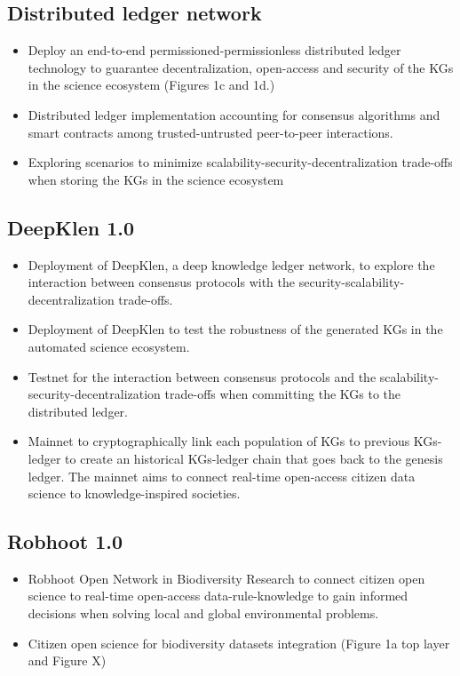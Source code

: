 \documentclass[10pt, a4paper, twocolumn]{article} %
\begin{document}
  \subsection{Distributed ledger network}
  \begin{itemize}
  \item Deploy an end-to-end permissioned-permissionless distributed
    ledger technology to guarantee decentralization, open-access and
    security of the KGs in the science ecosystem (Figures 1c and 1d.)
  \item Distributed ledger implementation accounting for consensus
    algorithms and smart contracts among trusted-untrusted
    peer-to-peer interactions.
  \item Exploring scenarios to minimize
    scalability-security-decentralization trade-offs when storing the
    KGs in the science ecosystem
  \end{itemize}
  \subsection{DeepKlen 1.0}  
  \begin{itemize}
  \item Deployment of DeepKlen, a deep knowledge ledger network, to
    explore the interaction between consensus protocols with the
    security-scalability-decentralization trade-offs.
  \item Deployment of DeepKlen to test the robustness of the generated
    KGs in the automated science ecosystem.
  \item Testnet for the interaction between consensus protocols and
    the scalability-security-decentralization trade-offs when
    committing the KGs to the distributed ledger.
  \item Mainnet to cryptographically link each population of KGs to
    previous KGs-ledger to create an historical KGs-ledger chain that
    goes back to the genesis ledger. The mainnet aims to connect
    real-time open-access citizen data science to knowledge-inspired
    societies.
  \end{itemize}
 \subsection{Robhoot 1.0}
 \begin{itemize}
 \item Robhoot Open Network in Biodiversity Research to connect
   citizen open science to real-time open-access data-rule-knowledge
   to gain informed decisions when solving local and global
   environmental problems.
 \item Citizen open science for biodiversity datasets integration
   (Figure 1a top layer and Figure X)
\end{itemize}
\end{document}
